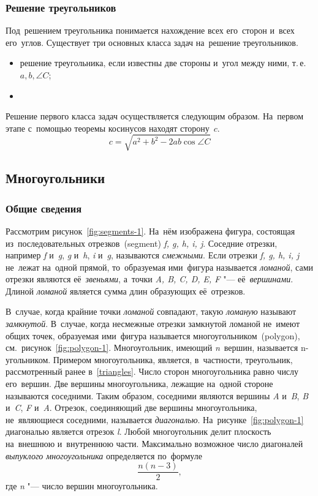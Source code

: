 \documentclass[]{scrartcl}
\begin{document}
\subsubsection{Решение треугольников}
Под~решением треугольника понимается нахождение всех его~сторон и~всех его~углов. Существует три основных класса задач на~решение треугольников.
\begin{itemize}
	\item решение треугольника, если известны две стороны и~угол между ними, т.\,е.~${\textstyle a,b,\angle C}$;
	\item 
\end{itemize}
Решение первого класса задач осуществляется следующим образом. На~первом этапе с~помощью  теоремы косинусов находят сторону~${\textstyle c}$.
\begin{equation}\label{eq:cosinus-theorem-2}
c=\sqrt{a^{2}+b^{2}-2ab\cos \angle C}
\end{equation}

\subsection{Многоугольники}

\subsubsection{Общие сведения}

Рассмотрим рисунок~\ref{fig:segments-1}. На~нём изображена фигура, состоящая из~последовательных отрезков~(\foreignlanguage{english}{segment}) \textit{f, g, h, i, j}. Соседние отрезки, например \textit{f} и~\textit{g}, \textit{g} и~\textit{h}, \textit{i} и~\textit{g}, называются \emph{смежными}. Если отрезки \textit{f, g, h, i, j} не~лежат на~одной прямой, то~образуемая ими~фигура называется \emph{ломаной}, сами отрезки являются её~\emph{звеньями}, а~точки \textit{A, B, C, D, E, F} "--- её~\emph{вершинами}. Длиной \emph{ломаной} является сумма длин образующих её~отрезков.

В~случае, когда крайние точки \emph{ломаной} совпадают, такую \emph{ломаную} называют \emph{замкнутой}. В~случае, когда несмежные отрезки замкнутой ломаной не~имеют общих точек, образуемая ими~фигура называется многоугольником~(\foreignlanguage{english}{polygon}), см.~рисунок~\ref{fig:polygon-1}. Многоугольник, имеющий \textit{n}~вершин, называется n-угольником. Примером многоугольника, является, в~частности, треугольник, рассмотренный ранее в~\ref{triangles}. Число сторон многоугольника равно числу его~вершин. Две вершины многоугольника, лежащие на~одной стороне называются  соседними. Таким образом, соседними являются вершины \textit{A} и~\textit{B}, \textit{B} и~\textit{C}, \textit{F} и~\textit{A}. Отрезок, соединяющий две вершины многоугольника, не~являющиеся соседними, называется \emph{диагональю}. На~рисунке~\ref{fig:polygon-1} диагональю является отрезок \textit{l}. Любой многоугольник делит плоскость на~внешнюю и~внутреннюю части. Максимально возможное число диагоналей \emph{выпуклого многоугольника} определяется по~формуле
\begin{equation}\label{eq:n-polygon-vertex}
\frac{n(n-3)}{2},
\end{equation}
где \textit{n} "--- число вершин многоугольника.
\end{document}
